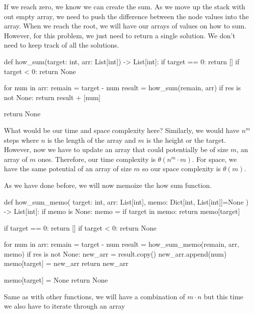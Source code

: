 \documentclass[12pt,dvipsnames,svgnames,x11names]{article}
\begin{document}
If we reach zero, we know we can create the sum. As we move up the stack with out empty array, we 
need to push the difference between the node values into the array. When we reach the root, we will
have our arrays of values on how to sum. However, for this problem, we just need to return a single 
solution. We don't need to keep track of all the solutions.
\begin{python}
def how_sum(target: int, arr: List[int]) -> List[int]:
  if target == 0:
    return []
  if target < 0:
    return None
    
  for num in arr:
    remain = target - num
    result = how_sum(remain, arr)
    if res is not None:
      return result + [num]
      
  return None
\end{python}
What would be our time and space complexity here? Similarly, we would have \(n^m\) steps where 
\(n\) is the length of the array and \(m\) is the height or the target. However, now we have to update an
array that could potentially be of size \(m\), an array of \(m\) ones. Therefore, our time complexity is
\(\theta(n^m\cdot m)\). For space, we have the same potential of an array of size \(m\) so our space
complexity is \(\theta(m)\).
\par\medskip
As we have done before, we will now memoize the how sum function.
\begin{python}
def how_sum_memo(
    target: int, 
    arr: List[int], 
    memo: Dict[int, List[int]]=None
    ) -> List[int]:
  if memo is None:
    memo = {}
  if target in memo:
    return memo[target]
    
  if target == 0:
    return []
  if target < 0:
    return None
    
  for num in arr:
    remain = target - num
    result = how_sum_memo(remain, arr, memo)
    if res is not None:
      new_arr = result.copy()
      new_arr.append(num)
      memo[target] = new_arr
      return new_arr
      
  memo[target] = None
  return None
\end{python}
Same as with other functions, we will have a combination of \(m\cdot n\) but this time we also have to
iterate through an array 
\end{document}
